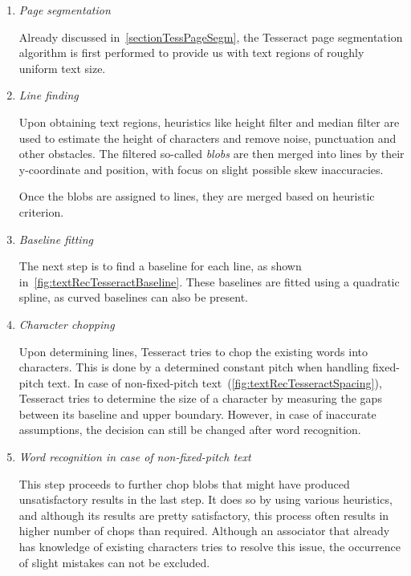 \begin{enumerate}
    \item \emph{Page segmentation}
    
    Already discussed in~\cref{sectionTessPageSegm}, the Tesseract page segmentation algorithm is first performed to provide us with text regions of roughly uniform text size.
    
    \item \emph{Line finding}
     
     Upon obtaining text regions, heuristics like height filter and median filter are used to estimate the height of characters and remove noise, punctuation and other obstacles. The filtered so-called \emph{blobs} are then merged into lines by their y-coordinate and position, with focus on slight possible skew inaccuracies.
     
     Once the blobs are assigned to lines, they are merged based on heuristic criterion.
     
     \item \emph{Baseline fitting}
    
    The next step is to find a baseline for each line, as shown in~\cref{fig:textRecTesseractBaseline}. These baselines are fitted using a quadratic spline, as curved baselines can also be present.
    
    \item \emph{Character chopping}
    
    Upon determining lines, Tesseract tries to chop the existing words into characters. This is done by a determined constant pitch when handling fixed-pitch text. In case of non-fixed-pitch text~(\cref{fig:textRecTesseractSpacing}), Tesseract tries to determine the size of a character by measuring the gaps between its baseline and upper boundary. However, in case of inaccurate assumptions, the decision can still be changed after word recognition.
    
    \item \emph{Word recognition in case of non-fixed-pitch text}
    
    This step proceeds to further chop blobs that might have produced unsatisfactory results in the last step. It does so by using various heuristics, and although its results are pretty satisfactory, this process often results in higher number of chops than required. Although an associator that already has knowledge of existing characters tries to resolve this issue, the occurrence of slight mistakes can not be excluded.
    

\end{enumerate}
